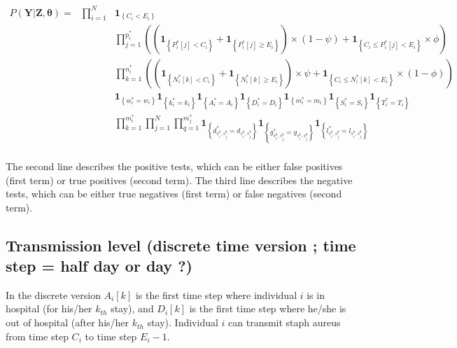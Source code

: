\documentclass[10pt]{article}
\begin{document}
\begin{eqnarray*}
P\left(\bm{Y}|\bm{Z},\bm{\theta}\right) = &
\bm{\prod}_{i=1}^N & %
 \mathbf{1}_{\left\lbrace C_i < E_i \right\rbrace} \\
 &&
 \bm{\prod}_{j=1}^{p_i^*} %
\left(
\left( \mathbf{1}_{\left\lbrace P_i^*[j] < C_i \right\rbrace}+\mathbf{1}_{\left\lbrace P_i^*[j] \geq E_i \right\rbrace} \right) \times \left(1-\psi\right) %
+ \mathbf{1}_{\left\lbrace C_i \leq P_i^*[j] < E_i \right\rbrace} \times \phi %
\right) \\ 
& & \bm{\prod}_{k=1}^{n_i^*} %
\left(
\left( \mathbf{1}_{\left\lbrace N_i^*[k] < C_i \right\rbrace}+\mathbf{1}_{\left\lbrace N_i^*[k] \geq E_i \right\rbrace} \right) \times \psi %
+ \mathbf{1}_{\left\lbrace C_i \leq N_i^*[k] < E_i \right\rbrace} \times \left(1-\phi\right) %
\right) \\ 
& & \mathbf{1}_{\left\lbrace w_i^* = w_i \right\rbrace} \mathbf{1}_{\left\lbrace k_i^* = k_i \right\rbrace} \mathbf{1}_{\left\lbrace A_i^* = A_i \right\rbrace} \mathbf{1}_{\left\lbrace D_i^* = D_i \right\rbrace} \mathbf{1}_{\left\lbrace m_i^* = m_i \right\rbrace} \mathbf{1}_{\left\lbrace S_i^* = S_i \right\rbrace} \mathbf{1}_{\left\lbrace T_i^* = T_i \right\rbrace}\\
& & \bm{\prod}_{k=1}^{m_i^*} \bm{\prod}_{j=1}^{N} \bm{\prod}_{q=1}^{m_j^*} \mathbf{1}_{\left\lbrace d_{s_i^k,s_j^q}^*=d_{s_i^k,s_j^q} \right\rbrace} 
\mathbf{1}_{\left\lbrace g_{s_i^k,s_j^q}^*=g_{s_i^k,s_j^q} \right\rbrace} \mathbf{1}_{\left\lbrace l_{s_i^k,s_j^q}^*=l_{s_i^k,s_j^q} \right\rbrace} \\
\end{eqnarray*}

The second line describes the positive tests, which can be either false positives (first term) or true positives (second term). 
The third line describes the negative tests, which can be either true negatives (first term) or false negatives (second term). 


\subsection*{Transmission level (discrete time version ; time step = half day or day ?)} 


In the discrete version $A_i[k]$ is the first time step where individual $i$ is in hospital (for his/her $k_{th}$ stay), and $D_i[k]$ is the first time step where he/she is out of hospital (after his/her $k_{th}$ stay). Individual $i$ can transmit staph aureus from time step $C_i$ to time step $E_i-1$. 
\end{document}
